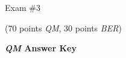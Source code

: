 \documentclass{article}
\begin{document}
\begin{EXAM}






\end{EXAM}

\begin{center}
\Large Exam \#3 \begin{EXAM}(70 points \emph{QM}, 30 points \emph{BER})\end{EXAM} \begin{KEY}\textbf{\emph{QM} Answer Key}\end{KEY}
\end{center}
\normalsize
\bigskip
\end{document}
